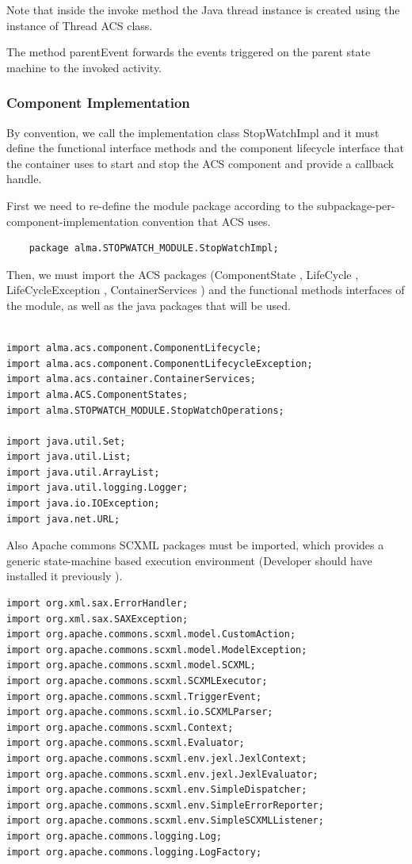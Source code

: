 \documentclass[]{article}
\begin{document}
Note that inside the \textsf{invoke} method the Java thread instance is created using the instance of Thread ACS class.

The method parentEvent forwards the events triggered on the parent state machine to the invoked activity. 

\subsubsection{Component Implementation}

By convention, we call the implementation class StopWatchImpl and it must define the functional interface methods and the component lifecycle interface that the container uses to start and stop the ACS component and provide a callback handle. 

First we need to re-define the module package according to the subpackage-per-component-implementation convention that ACS uses. 

\begin{lstlisting}
	package alma.STOPWATCH_MODULE.StopWatchImpl; 
\end{lstlisting}	

Then, we must import the ACS packages (ComponentState , LifeCycle , LifeCycleException , ContainerServices ) and the functional methods interfaces of the module, as well as the java packages that will be used. 

\begin{lstlisting}

import alma.acs.component.ComponentLifecycle;
import alma.acs.component.ComponentLifecycleException;
import alma.acs.container.ContainerServices;
import alma.ACS.ComponentStates;
import alma.STOPWATCH_MODULE.StopWatchOperations;

import java.util.Set;
import java.util.List;
import java.util.ArrayList;
import java.util.logging.Logger;
import java.io.IOException;
import java.net.URL;

\end{lstlisting}

Also Apache commons SCXML packages must be imported, which provides a generic state-machine based execution environment (Developer should have installed it previously ).

\begin{lstlisting}
import org.xml.sax.ErrorHandler;
import org.xml.sax.SAXException;
import org.apache.commons.scxml.model.CustomAction;
import org.apache.commons.scxml.model.ModelException;
import org.apache.commons.scxml.model.SCXML;
import org.apache.commons.scxml.SCXMLExecutor;
import org.apache.commons.scxml.TriggerEvent;
import org.apache.commons.scxml.io.SCXMLParser;
import org.apache.commons.scxml.Context;
import org.apache.commons.scxml.Evaluator;
import org.apache.commons.scxml.env.jexl.JexlContext;
import org.apache.commons.scxml.env.jexl.JexlEvaluator;
import org.apache.commons.scxml.env.SimpleDispatcher;
import org.apache.commons.scxml.env.SimpleErrorReporter;
import org.apache.commons.scxml.env.SimpleSCXMLListener;
import org.apache.commons.logging.Log;
import org.apache.commons.logging.LogFactory;

\end{lstlisting}	
\end{document}
